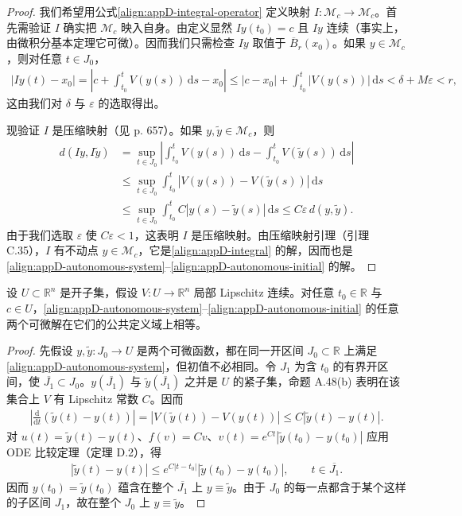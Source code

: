 \documentclass[../../main.tex]{subfiles}
\begin{document}
\begin{proof}
我们希望用公式\eqref{align:appD-integral-operator} 定义映射 $I:\mathcal M_c\to\mathcal M_c$。首先需验证 $I$ 确实把 $\mathcal M_c$ 映入自身。由定义显然 $Iy(t_0)=c$ 且 $Iy$ 连续（事实上，由微积分基本定理它可微）。因而我们只需检查 $Iy$ 取值于 $\overline B_r(x_0)$。如果 $y\in\mathcal M_c$，则对任意 $t\in J_0$，
\begin{align*}
|Iy(t)-x_0|=\left|c+\int_{t_0}^t V(y(s))\,\mathrm{d}s-x_0\right|
\leqslant|c-x_0|+\int_{t_0}^t|V(y(s))|\,\mathrm{d}s
<\delta+M\varepsilon<r,
\end{align*}
这由我们对 $\delta$ 与 $\varepsilon$ 的选取得出。

现验证 $I$ 是压缩映射（见 p. 657）。如果 $y,\widetilde y\in\mathcal M_c$，则
\begin{align*}
d(Iy,I\widetilde y)
&=\sup_{t\in J_0}\left|\int_{t_0}^t V(y(s))\,\mathrm{d}s-\int_{t_0}^t V(\widetilde y(s))\,\mathrm{d}s\right|\\
&\leqslant\sup_{t\in J_0}\int_{t_0}^t|V(y(s))-V(\widetilde y(s))|\,\mathrm{d}s\\
&\leqslant\sup_{t\in J_0}\int_{t_0}^t C|y(s)-\widetilde y(s)|\,\mathrm{d}s
\leqslant C\varepsilon\,d(y,\widetilde y).
\end{align*}
由于我们选取 $\varepsilon$ 使 $C\varepsilon<1$，这表明 $I$ 是压缩映射。由压缩映射引理（引理 C.35），$I$ 有不动点 $y\in\mathcal M_c$，它是\eqref{align:appD-integral} 的解，因而也是\eqref{align:appD-autonomous-system}--\eqref{align:appD-autonomous-initial} 的解。
\end{proof}

\begin{theorem}\label{theorem:appD-uniqueness}
设 $U\subset\mathbb R^n$ 是开子集，假设 $V:U\to\mathbb R^n$ 局部 Lipschitz 连续。对任意 $t_0\in\mathbb R$ 与 $c\in U$，\eqref{align:appD-autonomous-system}--\eqref{align:appD-autonomous-initial} 的任意两个可微解在它们的公共定义域上相等。
\end{theorem}

\begin{proof}
先假设 $y,\widetilde y:J_0\to U$ 是两个可微函数，都在同一开区间 $J_0\subset\mathbb R$ 上满足\eqref{align:appD-autonomous-system}，但初值不必相同。令 $J_1$ 为含 $t_0$ 的有界开区间，使 $\overline{J_1}\subset J_0$。$y(\overline{J_1})$ 与 $\widetilde y(\overline{J_1})$ 之并是 $U$ 的紧子集，命题 A.48(b) 表明在该集合上 $V$ 有 Lipschitz 常数 $C$。因而
\begin{align*}
\left|\frac{\mathrm{d}}{\mathrm{d}t}(\widetilde y(t)-y(t))\right|
=|V(\widetilde y(t))-V(y(t))|\leqslant C|\widetilde y(t)-y(t)|.
\end{align*}
对 $u(t)=\widetilde y(t)-y(t)$、$f(v)=Cv$、$v(t)=e^{Ct}|\widetilde y(t_0)-y(t_0)|$ 应用 ODE 比较定理（定理 D.2），得
\begin{align}\label{align:appD-uniqueness-estimate}
|\widetilde y(t)-y(t)|\leqslant e^{C|t-t_0|}|\widetilde y(t_0)-y(t_0)|,\qquad t\in\overline{J_1}.
\end{align}
因而 $y(t_0)=\widetilde y(t_0)$ 蕴含在整个 $\overline{J_1}$ 上 $y\equiv\widetilde y$。由于 $J_0$ 的每一点都含于某个这样的子区间 $J_1$，故在整个 $J_0$ 上 $y\equiv\widetilde y$。
\end{proof}
\end{document}
